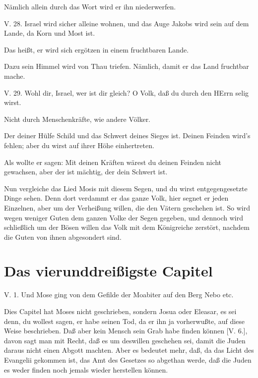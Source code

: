 Nämlich allein durch das Wort wird er ihn niederwerfen.

\begin{schriftzitat}
V. 28. Israel wird sicher alleine wohnen, und das Auge Jakobs wird sein auf dem Lande, da Korn und Most ist.
\end{schriftzitat}

Das heißt, er wird sich ergötzen in einem fruchtbaren Lande.

Dazu sein Himmel wird von Thau triefen. Nämlich, damit er das Land fruchtbar mache.

\begin{schriftzitat}
V. 29. Wohl dir, Israel, wer ist dir gleich? O Volk, daß du durch den HErrn selig wirst.
\end{schriftzitat}

Nicht durch Menschenkräfte, wie andere Völker.

Der deiner Hülfe Schild und das Schwert deines Sieges ist. Deinen Feinden wird’s fehlen; aber du wirst auf ihrer Höhe einhertreten.

Als wollte er sagen: Mit deinen Kräften wärest du deinen Feinden nicht gewachsen, aber der ist mächtig, der dein Schwert ist.

Nun vergleiche das Lied Mosis mit diesem Segen, und du wirst entgegengesetzte Dinge sehen. Denn dort verdammt er das ganze Volk, hier segnet er jeden Einzelnen, aber um der Verheißung willen, die den Vätern geschehen ist. So wird wegen weniger Guten dem ganzen Volke der Segen gegeben, und dennoch wird schließlich um der Bösen willen das Volk mit dem Königreiche zerstört, nachdem die Guten von ihnen abgesondert sind.

\section{Das vierunddreißigste Capitel}

\begin{schriftzitat}
V. 1. Und Mose ging von dem Gefilde der Moabiter auf den Berg Nebo etc.
\end{schriftzitat}

Dies Capitel hat Moses nicht geschrieben, sondern Josua oder Eleasar, es sei denn, du wollest sagen, er habe seinen Tod, da er ihn ja vorherwußte, auf diese Weise beschrieben. Daß aber kein Mensch sein Grab habe finden können [V. 6.], davon sagt man mit Recht, daß es um deswillen geschehen sei, damit die Juden daraus nicht einen Abgott machten. Aber es bedeutet mehr, daß, da das Licht des Evangelii gekommen ist, das Amt des Gesetzes so abgethan werde, daß die Juden es weder finden noch jemals wieder herstellen können.

